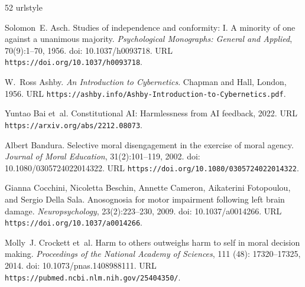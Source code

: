 \documentclass[11pt,a4paper]{article}
\theoremstyle{remark}
\begin{document}


\begin{thebibliography}{52}
\providecommand{\natexlab}[1]{#1}
\providecommand{\url}[1]{\texttt{#1}}
\expandafter\ifx\csname urlstyle\endcsname\relax
  \providecommand{\doi}[1]{doi: #1}\else
  \providecommand{\doi}{doi: \begingroup \urlstyle{rm}\Url}\fi

Solomon~E. Asch.
\newblock Studies of independence and conformity: I. A minority of one against
a unanimous majority.
\newblock \emph{Psychological Monographs: General and Applied}, 70(9):1--70, 1956.
\newblock \doi{10.1037/h0093718}.
\newblock URL \url{https://doi.org/10.1037/h0093718}.

W.~Ross Ashby.
\newblock \emph{An Introduction to Cybernetics}.
\newblock Chapman and Hall, London, 1956.
\newblock URL \url{https://ashby.info/Ashby-Introduction-to-Cybernetics.pdf}.

Yuntao Bai et~al.
\newblock Constitutional {AI}: Harmlessness from {AI} feedback, 2022.
\newblock URL \url{https://arxiv.org/abs/2212.08073}.

Albert Bandura.
\newblock Selective moral disengagement in the exercise of moral agency.
\newblock \emph{Journal of Moral Education}, 31(2):101--119, 2002.
\newblock \doi{10.1080/0305724022014322}.
\newblock URL \url{https://doi.org/10.1080/0305724022014322}.

Gianna Cocchini, Nicoletta Beschin, Annette Cameron, Aikaterini Fotopoulou, and Sergio Della Sala.
\newblock Anosognosia for motor impairment following left brain damage.
\newblock \emph{Neuropsychology}, 23(2):223--230, 2009.
\newblock \doi{10.1037/a0014266}.
\newblock URL \url{https://doi.org/10.1037/a0014266}.

Molly~J. Crockett et~al.
\newblock Harm to others outweighs harm to self in moral decision making.
\newblock \emph{Proceedings of the National Academy of Sciences}, 111
  (48): 17320--17325, 2014.
\newblock \doi{10.1073/pnas.1408988111}.
\newblock URL \url{https://pubmed.ncbi.nlm.nih.gov/25404350/}.


\end{thebibliography}
\end{document}
